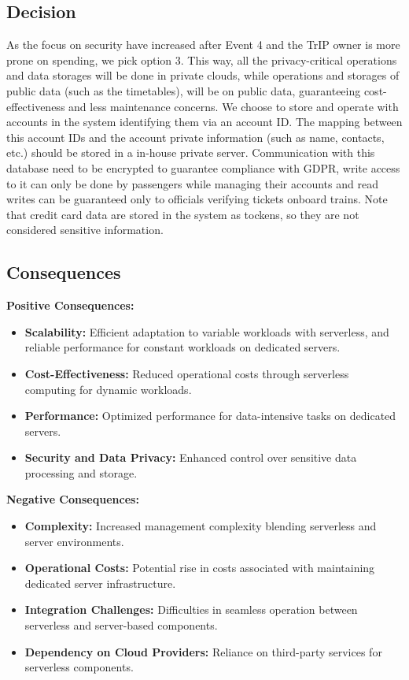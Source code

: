 \subsection*{Decision}
As the focus on security have increased after Event 4 and the TrIP owner is more prone on spending, we pick option 3. This way, all the privacy-critical operations and data storages will be done in private clouds, while operations and storages of public data (such as the timetables),
will be on public data, guaranteeing cost-effectiveness and less maintenance concerns.
We choose to store and operate with accounts in the system identifying them via an account ID. The mapping between this account IDs and the account private information (such as name, contacts, etc.) should be stored in a in-house private server.
Communication with this database need to be encrypted to guarantee compliance with GDPR, write access to it can only be done by passengers while managing their accounts and read writes can be guaranteed only to officials verifying tickets onboard trains.
Note that credit card data are stored in the system as tockens, so they are not considered sensitive information.

\subsection*{Consequences}
\textbf{Positive Consequences:}
\begin{itemize}
    \item \textbf{Scalability:} Efficient adaptation to variable workloads with serverless, and reliable performance for constant workloads on dedicated servers.
    \item \textbf{Cost-Effectiveness:} Reduced operational costs through serverless computing for dynamic workloads.
    \item \textbf{Performance:} Optimized performance for data-intensive tasks on dedicated servers.
    \item \textbf{Security and Data Privacy:} Enhanced control over sensitive data processing and storage.
\end{itemize}

\textbf{Negative Consequences:}
\begin{itemize}
    \item \textbf{Complexity:} Increased management complexity blending serverless and server environments.
    \item \textbf{Operational Costs:} Potential rise in costs associated with maintaining dedicated server infrastructure.
    \item \textbf{Integration Challenges:} Difficulties in seamless operation between serverless and server-based components.
    \item \textbf{Dependency on Cloud Providers:} Reliance on third-party services for serverless components.
\end{itemize}
